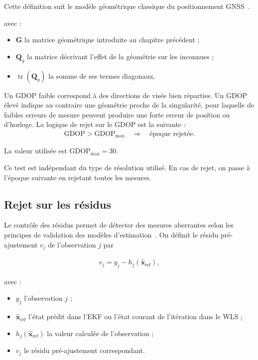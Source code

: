 Cette définition suit le modèle géométrique classique du positionnement
GNSS~\cite{odijk2017positioning}.

avec :

\begin{itemize}
    \item $\mathbf G$ la matrice géométrique introduite au chapitre précédent ;
    \item $\mathbf Q_g$ la matrice décrivant l'effet de la géométrie sur les
    inconnues ;
    \item $\operatorname{tr}(\mathbf Q_g)$ la somme de ses termes diagonaux.
\end{itemize}

Un GDOP faible correspond à des directions de visée bien réparties. Un GDOP
élevé indique au contraire une géométrie proche de la singularité, pour
laquelle de faibles erreurs de mesure peuvent produire une forte erreur de
position ou d'horloge. La logique de rejet sur le GDOP est la suivante :
\begin{align}
\mathrm{GDOP} > \mathrm{GDOP}_{\max}
\quad\Longrightarrow\quad
\text{époque rejetée}.
\label{eq:gdop_threshold}
\end{align}


La valeur utilisée est $\mathrm{GDOP}_{\max}=30$.

Ce test est indépendant du type de résolution utilisé. En cas de rejet,
on passe à l'époque suivante en rejetant toutes les mesures.

\subsection{Rejet sur les résidus}

Le contrôle des résidus permet de détecter des mesures aberrantes selon les
principes de validation des modèles d'estimation~\cite{teunissen2017validation}.
On définit le résidu pré-ajustement $v_j$ de l'observation $j$ par

\begin{align}
v_j
=
y_j-h_j\!\left(\widehat{\mathbf x}_{\mathrm{ref}}\right),
\label{eq:prefit_residual_rejection}
\end{align}

avec :

\begin{itemize}
    \item $y_j$ l'observation $j$ ;
    \item $\widehat{\mathbf x}_{\mathrm{ref}}$ l'état prédit dans l'EKF ou
    l'état courant de l'itération dans le WLS ;
    \item $h_j(\widehat{\mathbf x}_{\mathrm{ref}})$ la valeur calculée de
    l'observation ;
    \item $v_j$ le résidu pré-ajustement correspondant.
\end{itemize}

